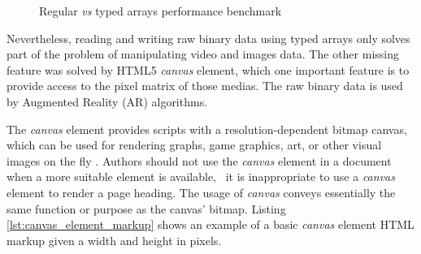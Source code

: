 \begin{figure}[!htb]
  \caption{Regular \textit{vs} typed arrays performance benchmark}
  \label{figure:typed_arrays_performance}
\end{figure}

Nevertheless, reading and writing raw binary data using typed arrays only solves part of the problem of manipulating video and images data. The other missing feature was solved by HTML5 \cite{Hickson2013} \textit{canvas} element, which one important feature is to provide access to the pixel matrix of those medias. The raw binary data is used by Augmented Reality (AR) algorithms.

The \textit{canvas} element provides scripts with a resolution-dependent bitmap canvas, which can be used for rendering graphs, game graphics, art, or other visual images on the fly \cite{Canvas2013}. Authors should not use the \textit{canvas} element in a document when a more suitable element is available, \eg\ it is inappropriate to use a \textit{canvas} element to render a page heading. The usage of \textit{canvas} conveys essentially the same function or purpose as the canvas' bitmap. Listing \ref{lst:canvas_element_markup} shows an example of a basic \textit{canvas} element HTML markup given a width and height in pixels.

